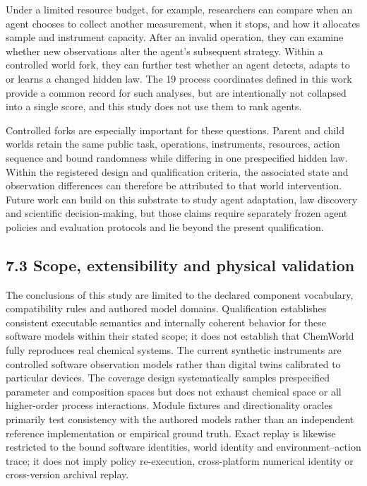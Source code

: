 \documentclass[10pt,twocolumn]{article}
\begin{document}
Under a limited resource budget, for example, researchers can compare
when an agent chooses to collect another measurement, when it stops, and
how it allocates sample and instrument capacity. After an invalid
operation, they can examine whether new observations alter the agent's
subsequent strategy. Within a controlled world fork, they can further
test whether an agent detects, adapts to or learns a changed hidden law.
The 19 process coordinates defined in this work provide a common record
for such analyses, but are intentionally not collapsed into a single
score, and this study does not use them to rank agents.

Controlled forks are especially important for these questions. Parent
and child worlds retain the same public task, operations, instruments,
resources, action sequence and bound randomness while differing in one
prespecified hidden law. Within the registered design and qualification
criteria, the associated state and observation differences can therefore
be attributed to that world intervention. Future work can build on this
substrate to study agent adaptation, law discovery and scientific
decision-making, but those claims require separately frozen agent
policies and evaluation protocols and lie beyond the present
qualification.

\subsection{7.3 Scope, extensibility and physical
validation}\label{scope-extensibility-and-physical-validation}

The conclusions of this study are limited to the declared component
vocabulary, compatibility rules and authored model domains.
Qualification establishes consistent executable semantics and internally
coherent behavior for these software models within their stated scope;
it does not establish that ChemWorld fully reproduces real chemical
systems. The current synthetic instruments are controlled software
observation models rather than digital twins calibrated to particular
devices. The coverage design systematically samples prespecified
parameter and composition spaces but does not exhaust chemical space or
all higher-order process interactions. Module fixtures and
directionality oracles primarily test consistency with the authored
models rather than an independent reference implementation or empirical
ground truth. Exact replay is likewise restricted to the bound software
identities, world identity and environment--action trace; it does not
imply policy re-execution, cross-platform numerical identity or
cross-version archival replay.
\end{document}
